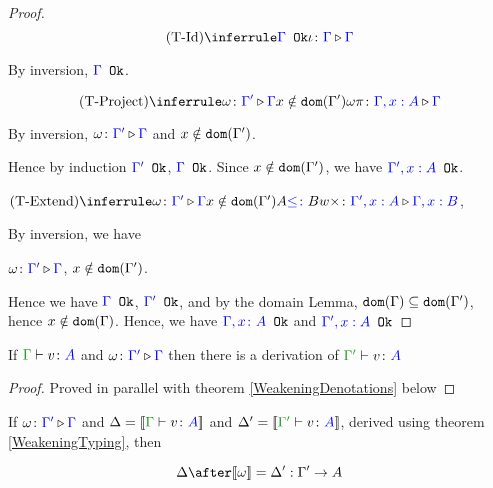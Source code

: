 \documentclass{report}
\begin{document}
\begin{framed}
    \begin{proof}
        
        \case{\tid}
        $$\ntreeruleI{\tid}{\ok{\G}}{\wrel{\i}{\G}{\G}}$$
        
        By inversion, ${\color{blue} \Gamma} \texttt{ Ok}$.
        
        \case{\tproject}
        $$\ntreeruleII{\tproject}{\wrel{\w}{\G'}{\G}}{ x \notin \dom{\G'}}{\wrel{\w \pi}{\G, x: A}{\G}}$$
        
        By inversion, $\omega \colon {\color{blue}\Gamma'} \triangleright {\color {blue} \Gamma}$ and $x\notin \texttt{dom}(\Gamma')$.
        
        Hence by induction ${\color{blue} \Gamma'} \texttt{ Ok}$, ${\color{blue} \Gamma} \texttt{ Ok}$. Since $x\notin\texttt{dom}(\Gamma')$, we have ${\color{blue} \Gamma', x:A} \texttt{ Ok}$.
        
        \case{\textend}
        $\ntreeruleIII{\textend}{\wrel{\w}{\G'}{\G}}{ x \notin \dom{\G'}}{ A \subtype B}{\wrel{w \x}{\G', x: A}{\G, x: B}}$, 
        
        By inversion, we have 
        
        $\omega \colon {\color{blue}\Gamma'} \triangleright {\color {blue} \Gamma}$, $x\notin\texttt{dom}(\Gamma')$.
        
        Hence we have ${\color{blue} \Gamma} \texttt{ Ok}$, ${\color{blue} \Gamma'} \texttt{ Ok}$, and by the domain Lemma, $\texttt{dom}(\Gamma)\subseteq\texttt{dom}(\Gamma')$, hence $x\notin\texttt{dom}(\Gamma)$. Hence, we have ${\color{blue} \Gamma, x\colon A} \texttt{ Ok}$ and ${\color{blue} \Gamma',x:A} \texttt{ Ok}$
        
        
    \end{proof}
\end{framed}



\begin{theorem}
    \label{WeakeningTyping}
    If $\gtyperelation{v}{A}$ and $\omega \colon {\color{blue}\Gamma'} \triangleright {\color {blue} \Gamma}$ then there is a derivation of $\typerelation{\G'}{v}{A}$
\end{theorem}

\begin{proof}
    Proved in parallel with theorem \ref{WeakeningDenotations} below
\end{proof}



\begin{theorem}\label{WeakeningDenotations}
    If $\omega \colon {\color{blue}\Gamma'} \triangleright {\color {blue} \Gamma}$ and $\D = \deno{\gtyperelation{v}{A}}$ and $\D' = \deno{\typerelation{\G'}{v}{A}}$, derived using theorem \ref{WeakeningTyping}, then 
    
    $$
        \D \after \deno{\w} = \D' : \G' \rightarrow A
    $$
\end{theorem}
\end{document}
